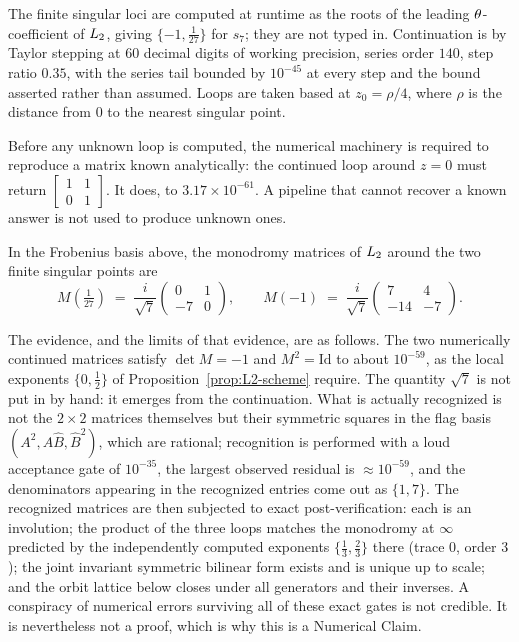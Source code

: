 The finite singular loci are computed at runtime as the roots of the leading
$\theta$-coefficient of $L_2$, giving $\{-1,\tfrac1{27}\}$ for $s_7$; they
are not typed in. Continuation is by Taylor stepping at 60 decimal digits of
working precision, series order $140$, step ratio $0.35$, with the series tail
bounded by $10^{-45}$ at every step and the bound asserted rather than
assumed. Loops are taken based at $z_0 = \rho/4$, where $\rho$ is the distance
from $0$ to the nearest singular point.

\begin{remark}\label{rem:machinery-control}
Before any unknown loop is computed, the numerical machinery is required to
reproduce a matrix known analytically: the continued loop around $z=0$ must
return $\left[\begin{smallmatrix}1&1\\0&1\end{smallmatrix}\right]$. It does, to
$3.17\times 10^{-61}$. A pipeline that cannot recover a known answer is not
used to produce unknown ones.
\end{remark}

\begin{numclaim}
\label{nc:monodromy}
In the Frobenius basis above, the monodromy matrices of $L_2$ around the two
finite singular points are
\[
  M(\tfrac1{27}) \;=\; \frac{i}{\sqrt7}
  \begin{pmatrix} 0 & 1 \\ -7 & 0\end{pmatrix},
  \qquad
  M(-1) \;=\; \frac{i}{\sqrt7}
  \begin{pmatrix} 7 & 4 \\ -14 & -7\end{pmatrix} .
\]
\end{numclaim}

The evidence, and the limits of that evidence, are as follows. The two
numerically continued matrices satisfy $\det M = -1$ and $M^2 = \mathrm{Id}$ to
about $10^{-59}$, as the local exponents $\{0,\tfrac12\}$ of
Proposition~\ref{prop:L2-scheme} require. The quantity $\sqrt7$ is not put in
by hand: it emerges from the continuation. What is actually recognized is not
the $2\times 2$ matrices themselves but their symmetric squares in the flag
basis $(A^2, A\widehat{B}, \widehat{B}^2)$, which are rational; recognition is
performed with a loud acceptance gate of $10^{-35}$, the largest observed
residual is ${\approx}10^{-59}$, and the denominators appearing in the
recognized entries come out as $\{1,7\}$. The recognized matrices are then
subjected to exact post-verification: each is an involution; the product of
the three loops matches the monodromy at $\infty$ predicted by the
independently computed exponents $\{\tfrac13,\tfrac23\}$ there (trace $0$,
order $3$); the joint invariant symmetric bilinear form exists and is unique
up to scale; and the orbit lattice below closes under all generators and their
inverses. A conspiracy of numerical errors surviving all of these exact gates
is not credible. It is nevertheless not a proof, which is why this is a
Numerical Claim.

